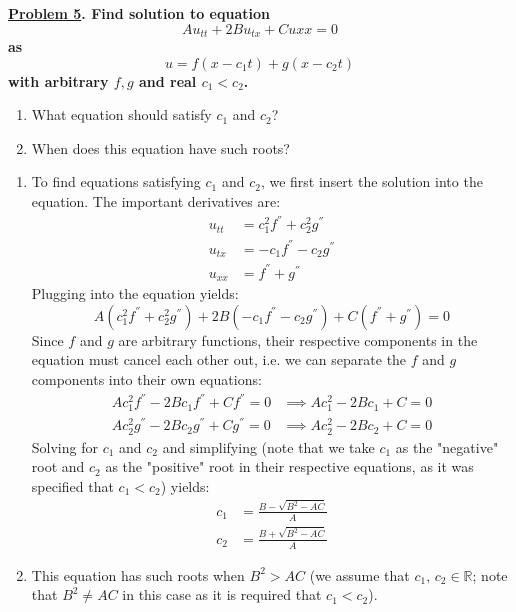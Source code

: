 \documentclass{article}
\theoremstyle{definition}
\newenvironment{boldenv}{\bfseries\boldmath}{}
\newcommand{\R}{\mathbb{R}}
\begin{document}
\begin{boldenv}
    \underline{Problem 5}. Find solution to equation
    \[Au_{tt}+2Bu_{tx}+Cu{xx} = 0\]
    as
    \[u = f(x-c_1t) + g(x-c_2t)\]
    with arbitrary $f, g$ and real $c_1 < c_2$. \begin{enumerate}
        \item What equation should satisfy $c_1$ and $c_2$?
        \item When does this equation have such roots?
    \end{enumerate}
\end{boldenv}
\begin{enumerate}
            \item To find equations satisfying $c_1$ and $c_2$, we first insert the solution into the equation. The important derivatives are:
            \begin{align*}
                u_{tt} &= c_1^2f^{''}+c_2^2g^{''}\\
                u_{tx} & = -c_1f^{''}-c_2g^{''}\\
                u_{xx} &= f^{''} + g^{''}
            \end{align*}
            Plugging into the equation yields:
            $$A(c_1^2f^{''}+c_2^2g^{''}) + 2B(-c_1f^{''}-c_2g^{''}) + C(f^{''} + g^{''}) = 0$$
            Since $f$ and $g$ are arbitrary functions, their respective components in the equation must cancel each other out, i.e. we can separate the $f$ and $g$ components into their own equations:
            \begin{align*}
                Ac_1^2f^{''}-2Bc_1f^{''}+Cf^{''} = 0 &\implies Ac_1^2 -2Bc_1+C=0\\
                Ac_2^2g^{''}-2Bc_2g^{''}+Cg^{''} = 0 &\implies Ac_2^2 -2Bc_2+C=0
            \end{align*}
            Solving for $c_1$ and $c_2$ and simplifying (note that we take $c_1$ as the "negative" root and $c_2$ as the "positive" root in their respective equations, as it was specified that $c_1<c_2$) yields:
            \begin{align*}
                c_1 &= \frac{B-\sqrt{B^2-AC}}{A}\\
                c_2 &= \frac{B+\sqrt{B^2-AC}}{A}
            \end{align*}
            \item This equation has such roots when $B^2 > AC$ (we assume that $c_1,\,c_2 \in \R$; note that $B^2 \neq AC$ in this case as it is required that $c_1<c_2$).
        \end{enumerate}
\end{document}
